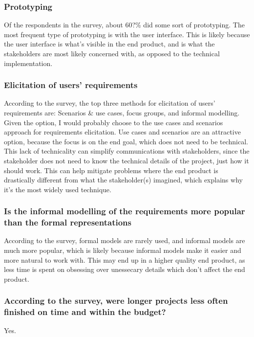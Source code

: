 \documentclass[letterpaper,12pt]{article}
\begin{document}
\subsubsection{Prototyping}

Of the respondents in the survey, about 60?\% did some sort of prototyping.
The most frequent type of prototyping is with the user interface. This is likely
because the user interface is what's visible in the end product, and is what the
stakeholders are most likely concerned with, as opposed to the technical implementation.
\subsubsection{Elicitation of users' requirements}

According to the survey, the top three methods for
elicitation of users’ requirements are: Scenarios \& use cases, focus groups, and informal modelling.
Given the option, I would probably choose to the use cases and scenarios approach for requirements
elicitation. Use cases and scenarios are an attractive option, because the focus is on the end goal,
which does not need to be technical. This lack of technicality can simplify communications with stakeholders,
since the stakeholder does not need to know the technical details of the project, just how it should work.
This can help mitigate problems where the end product is drastically different from what the stakeholder(s)
imagined, which explains why it's the most widely used technique.

\subsubsection{Is the informal modelling of the requirements more
 popular than the formal representations}

According to the survey, formal models are rarely used, and informal models are
much more popular, which is likely because informal models make it easier and more
natural to work with. This may end up in a higher quality end product, as less time
is spent on obsessing over unessecary details which don't affect the end product.
\subsubsection{According to the survey, were longer projects less often finished on
 time and within the budget?}
Yes.
\end{document}
